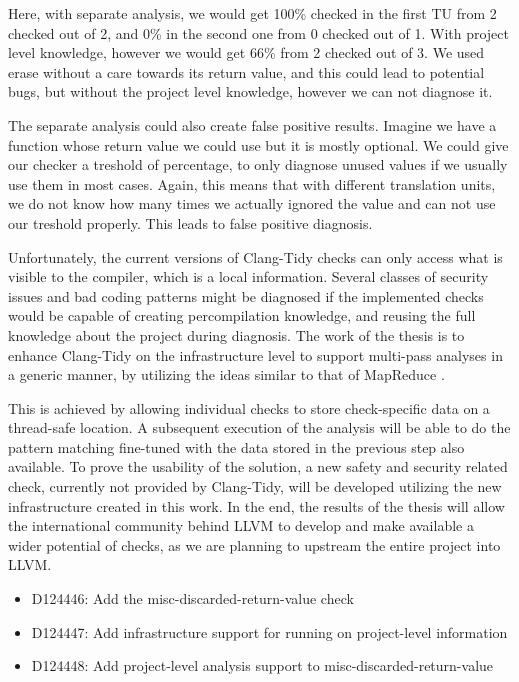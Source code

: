 Here, with separate analysis, we would get 100\% checked in the first TU from 2 checked out of 2,
and 0\% in the second one from 0 checked out of 1. With project level knowledge, however we
would get 66\% from 2 checked out of 3. We used erase without a care towards its return value, and this could lead to potential bugs, but without the project
level knowledge, however we can not diagnose it.

The separate analysis could also create false positive results. Imagine we have a function whose return value we could use but it is mostly
optional. We could give our checker a treshold of percentage, to only diagnose unused values if we usually use them in most cases. Again, this
means that with different translation units, we do not know how many times we actually ignored the value and can not use our treshold properly.
This leads to false positive diagnosis.

Unfortunately, the current versions of Clang-Tidy checks can only access what is visible to the compiler, which is a local information.
Several classes of security issues and bad coding patterns might be diagnosed if the implemented checks would be capable of creating 
percompilation knowledge, and reusing the full knowledge about the project during diagnosis. \cite{googlearticle}
The work of the thesis is to enhance Clang-Tidy on the infrastructure level to support multi-pass analyses in a generic manner, by 
utilizing the ideas similar to that of MapReduce \cite{mapreduce}.

This is achieved by allowing individual checks to store check-specific data on a thread-safe location.
A subsequent execution of the analysis will be able to do the pattern matching fine-tuned with the data stored in the previous step also
available.
To prove the usability of the solution, a new safety and security related check, currently not provided by Clang-Tidy, will be developed
utilizing the new infrastructure created in this work.
In the end, the results of the thesis will allow the international community behind LLVM to develop and make available a wider potential of
checks, as we are planning to upstream the entire project into LLVM. 

\begin{itemize}
    \item D124446: Add the misc-discarded-return-value check \cite{upstream1}
    \item D124447: Add infrastructure support for running on project-level information \cite{upstream2}
    \item D124448: Add project-level analysis support to misc-discarded-return-value \cite{upstream3}
\end{itemize}

